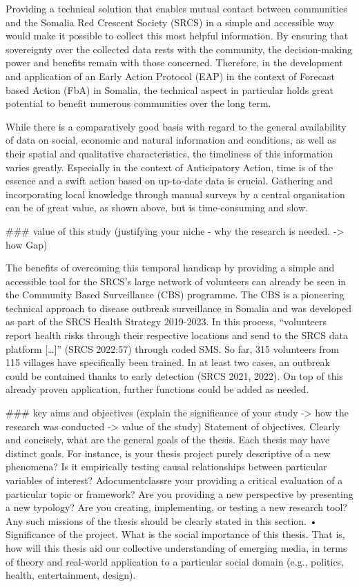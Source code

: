 Providing a technical solution that enables mutual contact between communities and the Somalia Red Crescent Society (SRCS) in a simple and accessible way would make it possible to collect this most helpful information. By ensuring that sovereignty over the collected data rests with the community, the decision-making power and benefits remain with those concerned. Therefore, in the development and application of an Early Action Protocol (EAP) in the context of Forecast based Action (FbA) in Somalia, the technical aspect in particular holds great potential to benefit numerous communities over the long term.


While there is a comparatively good basis with regard to the general availability of data on social, economic and natural information and conditions, as well as their spatial and qualitative characteristics, the timeliness of this information varies greatly. Especially in the context of Anticipatory Action, time is of the essence and a swift action based on up-to-date data is crucial. Gathering and incorporating local knowledge through manual surveys by a central organisation can be of great value, as shown above, but is time-consuming and slow.


\#\#\# value of this study
(justifying your niche - why the research is needed. -> how Gap)

The benefits of overcoming this temporal handicap by providing a simple and accessible tool for the SRCS’s large network of volunteers can already be seen in the Community Based Surveillance (CBS) programme. The CBS is a pioneering technical approach to disease outbreak surveillance in Somalia and was developed as part of the SRCS Health Strategy 2019-2023. In this process, “volunteers report health risks through their respective locations and send to the SRCS data platform […]” (SRCS 2022:57) through coded SMS. So far, 315 volunteers from 115 villages have specifically been trained. In at least two cases, an outbreak could be contained thanks to early detection (SRCS 2021, 2022). On top of this already proven application, further functions could be added as needed.

\#\#\# key aims and objectives
(explain the significance of your study -> how the research was conducted -> value of the study)
Statement of objectives. Clearly and concisely, what are the general goals of the
thesis. Each thesis may have distinct goals. For instance, is your thesis project purely
descriptive of a new phenomena? Is it empirically testing causal relationships
between particular variables of interest? Adocumentclassre your providing a critical evaluation of a
particular topic or framework? Are you providing a new perspective by presenting a
new typology? Are you creating, implementing, or testing a new research tool? Any
such missions of the thesis should be clearly stated in this section.
• Significance of the project. What is the social importance of this thesis. That is, how
will this thesis aid our collective understanding of emerging media, in terms of
theory and real-world application to a particular social domain (e.g., politics, health,
entertainment, design).


